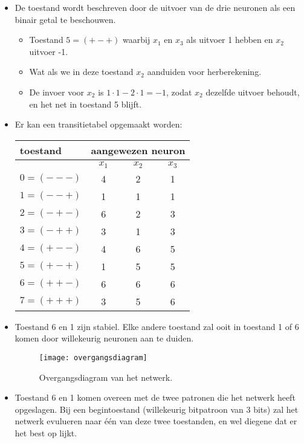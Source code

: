 \begin{itemize}
\begin{itemize}
\begin{figure}[ht]
        \end{figure}
        \item De toestand wordt beschreven door de uitvoer van de drie neuronen als een binair getal te beschouwen. 
        \begin{itemize}
            \item Toestand $5 = (+ - +)$ waarbij $x_1$ en $x_3$ als uitvoer 1 hebben en $x_2$ uitvoer -1.
            \item Wat als we in deze toestand $x_2$ aanduiden voor herberekening.
            \item De invoer voor $x_2$ is $1 \cdot 1 - 2 \cdot 1 = -1$, zodat $x_2$ dezelfde uitvoer behoudt, en het net in toestand 5 blijft.
        \end{itemize}
        \item Er kan een transitietabel opgemaakt worden:
        \begin{table}[ht]
            \centering
            \begin{tabular}{| l | c  c  c |}
                \hline
                toestand & \multicolumn{3}{c|}{aangewezen neuron} \\
                \hline
                & $x_1$ & $x_2$ & $x_3$ \\
                \hline
                $0=(---)$ & 4 & 2 & 1 \\
                $1=(--+)$ & 1 & 1 & 1 \\
                $2=(-+-)$ & 6 & 2 & 3 \\
                $3=(-++)$ & 3 & 1 & 3 \\
                $4=(+--)$ & 4 & 6 & 5 \\
                $5=(+-+)$ & 1 & 5 & 5 \\
                $6=(++-)$ & 6 & 6 & 6 \\
                $7=(+++)$ & 3 & 5 & 6 \\
                \hline
            \end{tabular}
        \end{table}
        \item Toestand 6 en 1 zijn stabiel. Elke andere toestand zal ooit in toestand 1 of 6 komen door willekeurig neuronen aan te duiden.
        \begin{figure}[ht]
            \centering
            \texttt{[image: overgangsdiagram]}
            \caption{Overgangsdiagram van het netwerk.}
            
        \end{figure}
        \item Toestand 6 en 1 komen overeen met de twee patronen die het netwerk heeft opgeslagen. Bij een begintoestand (willekeurig bitpatroon van 3 bits) zal het netwerk evulueren naar één van deze twee toestanden, en wel diegene dat er het best op lijkt.
    \end{itemize}
\end{itemize}
